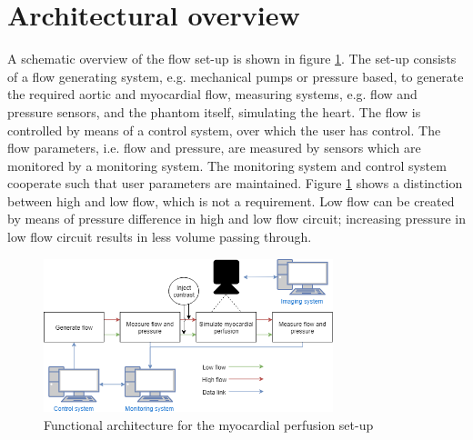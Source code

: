 \section{Architectural overview}
A schematic overview of the flow set-up is shown in figure \ref{fig:funcarch}. The set-up consists of a flow generating system, e.g. mechanical pumps or pressure based, to generate the required aortic and myocardial flow, measuring systems, e.g. flow and pressure sensors, and the phantom itself, simulating the heart. The flow is controlled by means of a control system, over which the user has control. The flow parameters, i.e. flow and pressure, are measured by sensors which are monitored by a monitoring system. The monitoring system and control system cooperate such that user parameters are maintained. Figure \ref{fig:funcarch} shows a distinction between high and low flow, which is not a requirement. Low flow can be created by means of pressure difference in high and low flow circuit; increasing pressure in low flow circuit results in less volume passing through.
\begin{figure}
	\includegraphics[width=0.75\textwidth]{./images/functional_architecture.png}
	\caption{Functional architecture for the myocardial perfusion set-up}
	\label{fig:funcarch}
\end{figure}
